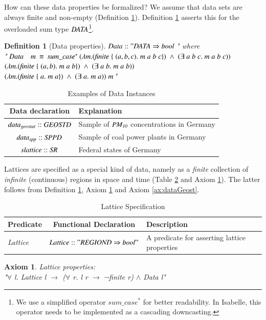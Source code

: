 \documentclass[final,authoryear,1p,times]{elsarticle}
\newtheorem{Axiom}{Axiom}
\newtheorem{definition}{Definition}
\begin{document}
How can these data properties be formalized? We assume that data sets are always finite and non-empty (Definition \ref{def:dataFiniteness}). Definition \ref{def:dataFiniteness} asserts this for the overloaded sum type ${\it DATA}$\footnote{We use a simplified operator $sum\_case^{*}$ for better readability. In Isabelle, this operator needs to be implemented as a cascading downcasting.}. 
\begin{definition} [Data properties]
 ${\it Data :: "DATA \Rightarrow bool \: }$"  where \\
 "${\it  \: Data \quad m \: \equiv \: sum\_case^{*} \: (\lambda m. (finite \; \lbrace \; (a,b,c). \; m \; a \; b \; c \rbrace) \; \wedge \; (\exists \; a \; b \;c . \; m \; a \; b \;c))}$ \\ ${\it(\lambda m. (finite \; \lbrace \; (a,b). \; m \; a \; b \rbrace) \; \wedge \; (\exists \; a \; b. \; m \; a \; b))}$
 \\ ${\it(\lambda m. (finite \; \lbrace \; a. \; m \; a \rbrace) \; \wedge \; (\exists \; a . \; m \; a)) \; m}$" 
\label{def:dataFiniteness}
\end{definition}

\begin{table}[htb]
\center
\caption{Examples of Data Instances}
\label{tab:dataexamples}
\begin{tabular}[c]{|c|p{5cm}|}
			\hline
			\textbf{Data declaration} & \textbf{Explanation}  \\
			\hline
			${\it data_{geostat} :: GEOSTD}$ & Sample of ${\it PM_{10}}$ concentrations in Germany  \\
			\hline
			${\it data_{spp} :: SPPD}$ & Sample of coal power plants in Germany \\
			\hline	
			${\it slattice :: SR}$ & Federal states of Germany  \\
			\hline							
\end{tabular}
\end{table}

Lattices are specified as a special kind of data, namely as a \textit{finite} collection of \textit{infinite} (continuous) regions in space and time (Table \ref{tab:lattice} and Axiom \ref{ax:latticeProps}). The latter follows from Definition \ref{def:dataFiniteness}, Axiom \ref{ax:latticeProps} and Axiom \ref{ax:dataGeost}.
\begin{table}[htb]
\center
\caption{Lattice Specification}
\label{tab:lattice}
\begin{tabular}[h]{|p{3cm}|c|p{4cm}|}
			\hline
			\textbf{Predicate} & \textbf{Functional Declaration} &  \textbf{Description} \\
			\hline
			\textit{Lattice} & ${\it Lattice :: "REGIOND \Rightarrow bool"}$ & A predicate for asserting lattice properties\\
			\hline
\end{tabular}
\end{table} 
\begin{Axiom}
Lattice properties: \\
 "$\forall$ l. Lattice l $\rightarrow$ ($\forall$ r. l r $\rightarrow$ $\neg$finite r) $\wedge$ Data l"
\label{ax:latticeProps}
\end{Axiom}
\end{document}
